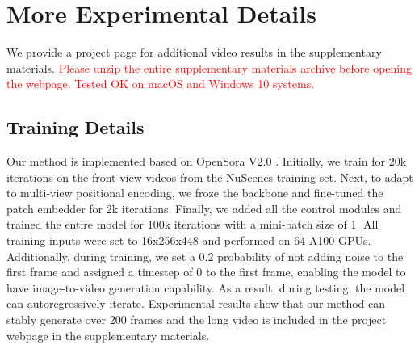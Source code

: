 


\section{More Experimental Details}  
\label{app: exp}


We provide a project page for additional video results in the supplementary materials.
\textcolor{red}{Please unzip the entire supplementary materials archive before opening the webpage. Tested OK on macOS and Windows 10 systems.}

\subsection{Training Details}
\label{app: Training}
Our method is implemented based on OpenSora V2.0 \cite{peng2025opensora20trainingcommerciallevel}. 
Initially, we train for 20k iterations on the front-view videos from the NuScenes training set. 
Next, to adapt to multi-view positional encoding, we froze the backbone and fine-tuned the patch embedder for 2k iterations. 
Finally, we added all the control modules and trained the entire model for 100k iterations with a mini-batch size of 1. 
All training inputs were set to 16x256x448 and performed on 64 A100 GPUs. Additionally, during training, we set a 0.2 probability of not adding noise to the first frame and assigned a timestep of 0 to the first frame, enabling the model to have image-to-video generation capability. As a result, during testing, the model can autoregressively iterate. Experimental results show that our method can stably generate over 200 frames and the long video is included in the project webpage in the supplementary materials.





